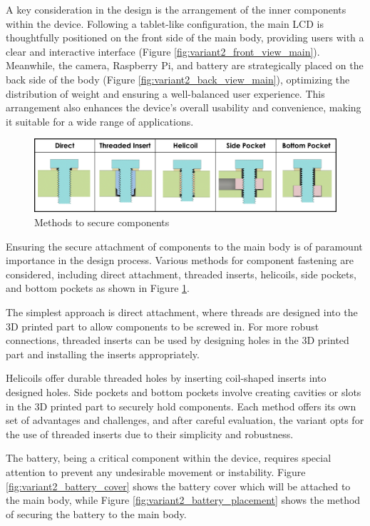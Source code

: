 A key consideration in the design is the arrangement of the inner components within the device. Following a tablet-like configuration, the main LCD is thoughtfully positioned on the front side of the main body, providing users with a clear and interactive interface (Figure \ref{fig:variant2_front_view_main}). Meanwhile, the camera, Raspberry Pi, and battery are strategically placed on the back side of the body (Figure \ref{fig:variant2_back_view_main}), optimizing the distribution of weight and ensuring a well-balanced user experience. This arrangement also enhances the device's overall usability and convenience, making it suitable for a wide range of applications.


\begin{figure}[ht!]
    \centering
    \includegraphics[width=\linewidth]{texs/Part1/chapter4/image/insert.png}
    \caption{Methods to secure components \cite{Hermann20}}
    \label{fig:insert}
\end{figure}


Ensuring the secure attachment of components to the main body is of paramount importance in the design process. Various methods for component fastening are considered, including direct attachment, threaded inserts, helicoils, side pockets, and bottom pockets as shown in Figure \ref{fig:insert}.

The simplest approach is direct attachment, where threads are designed into the 3D printed part to allow components to be screwed in. For more robust connections, threaded inserts can be used by designing holes in the 3D printed part and installing the inserts appropriately.

Helicoils offer durable threaded holes by inserting coil-shaped inserts into designed holes. Side pockets and bottom pockets involve creating cavities or slots in the 3D printed part to securely hold components. Each method offers its own set of advantages and challenges, and after careful evaluation, the variant opts for the use of threaded inserts due to their simplicity and robustness.

The battery, being a critical component within the device, requires special attention to prevent any undesirable movement or instability. Figure \ref{fig:variant2_battery_cover} shows the battery cover which will be attached to the main body, while Figure \ref{fig:variant2_battery_placement} shows the method of securing the battery to the main body.


